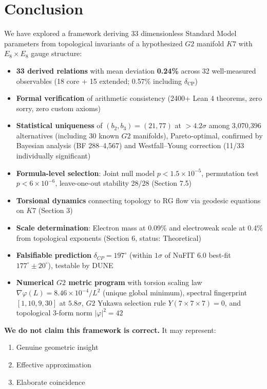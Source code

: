 \documentclass[11pt,a4paper]{article}
\newcommand{\E}{\mathrm{E}}
\newcommand{\Gtwo}{\mathrm{G}_2}
\newcommand{\Kseven}{K_7}
\newcommand{\CP}{\mathrm{CP}}
\newcommand{\theoretical}{\textsc{Theoretical}}
\def\CP{CP}%
\def\Gtwo{G2}%
\def\Kseven{K7}%
\def\E{E}%
\def\theoretical{Theoretical}%
\begin{document}
\section{Conclusion}

We have explored a framework deriving 33 dimensionless Standard Model parameters from topological invariants of a hypothesized $\Gtwo$ manifold $\Kseven$ with $\E_8 \times \E_8$ gauge structure:

\begin{itemize}
\item \textbf{33 derived relations} with mean deviation \textbf{0.24\%} across 32 well-measured observables (18 core + 15 extended; 0.57\% including $\delta_{\mathrm{CP}}$)
\item \textbf{Formal verification} of arithmetic consistency (2400+ Lean 4 theorems, zero sorry, zero custom axioms)
\item \textbf{Statistical uniqueness} of $(b_2, b_3) = (21, 77)$ at $> 4.2\sigma$ among 3,070,396 alternatives (including 30 known $\Gtwo$ manifolds), Pareto-optimal, confirmed by Bayesian analysis (BF 288--4{,}567) and Westfall--Young correction (11/33 individually significant)
\item \textbf{Formula-level selection}: Joint null model $p < 1.5 \times 10^{-5}$, permutation test $p < 6 \times 10^{-6}$, leave-one-out stability 28/28 (Section 7.5)
\item \textbf{Torsional dynamics} connecting topology to RG flow via geodesic equations on $\Kseven$ (Section 3)
\item \textbf{Scale determination}: Electron mass at 0.09\% and electroweak scale at 0.4\% from topological exponents (Section 6, status: \theoretical{})
\item \textbf{Falsifiable prediction} $\delta_{\CP} = 197^\circ$ (within $1\sigma$ of NuFIT 6.0 best-fit $177^\circ \pm 20^\circ$), testable by DUNE
\item \textbf{Numerical $\Gtwo$ metric program} with torsion scaling law $\nabla\varphi(L) = 8.46 \times 10^{-4}/L^2$ (unique global minimum), spectral fingerprint $[1, 10, 9, 30]$ at $5.8\sigma$, $\Gtwo$ Yukawa selection rule $Y(7 \times 7 \times 7) = 0$, and topological 3-form norm $|\varphi|^2 = 42$
\end{itemize}

\textbf{We do not claim this framework is correct.} It may represent:

\begin{enumerate}
\item[(a)] Genuine geometric insight
\item[(b)] Effective approximation
\item[(c)] Elaborate coincidence
\end{enumerate}
\end{document}
